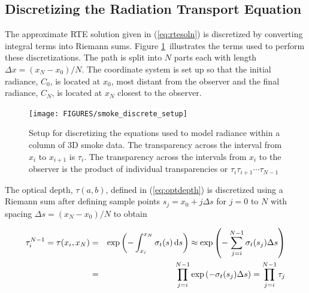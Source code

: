 \subsection{Discretizing the Radiation Transport Equation}
\newcommand{\htau}[1]{\tau_{#1}^{N-1}}
\newcommand{\halpha}[1]{\alpha_{#1}^{N-1}}
\newcommand{\sigai}[1]{\sigma_{a,#1}}
\newcommand{\Lei}[1]{C_{e,#1}}
\newcommand{\Lhatj}[1]{C_{#1}^N}
\newcommand{\Lhatjj}[1]{\hat{C}_{#1}^N}
\newcommand{\Chatjj}[1]{\hat{C}_{#1}^N}
\newcommand{\Leii}[1]{\hat{C}_{e,#1}}

The approximate RTE solution given in (\ref{eq:rtesoln}) is
discretized by converting integral terms into Riemann sums. Figure
\ref{fig:smokediscretesetup}\ illustrates the terms used to
perform these discretizations.  The path is split into $N$ parts
each with length $\Delta x=(x_N-x_0)/N$.  The coordinate system is
set up so that the initial radiance, $C_0$, is located at $x_0$,
most distant from the observer and the final radiance, $C_N$, is
located at $x_N$ closest to the observer.

\begin{figure}[\figoptions]
\begin{center}
\texttt{[image: FIGURES/smoke\_discrete\_setup]}
\end{center}
\caption[Setup for discretizing the equations used to model
radiance within a column of 3D smoke data.]{Setup for discretizing the equations used to model
radiance within a column of 3D smoke data. The transparency across the interval from $x_i$ to $x_{i+1}$ is $\tau_i$.
The transparency across the intervals from $x_i$ to the observer is the product of individual transparencies or $\tau_i\tau_{i+1}\cdots\tau_{N-1}$}
\label{fig:smokediscretesetup}
\end{figure}

The optical depth, $\tau(a,b)$, defined in (\ref{eq:optdepth}) is discretized using a Riemann sum  after defining sample points $s_j=x_0+j\Delta s$ for $j=0$ to $N$ with spacing $\Delta s=(x_N-x_0)/N$ to obtain

\begin{eqnarray}
\htau{i}=\tau(x_i,x_N)&=&\exp\left(-\int_{x_i}^{x_N}\sigma_t(s)\dx{s}\right)\approx\exp\left(-\sum_{j=i}^{N-1}\sigma_t(s_j)\Delta s\right)\\
&=&\prod_{j=i}^{N-1}\exp\left(-\sigma_t(s_j)\Delta s\right)=\prod_{j=i}^{N-1}\tau_j
\end{eqnarray}

